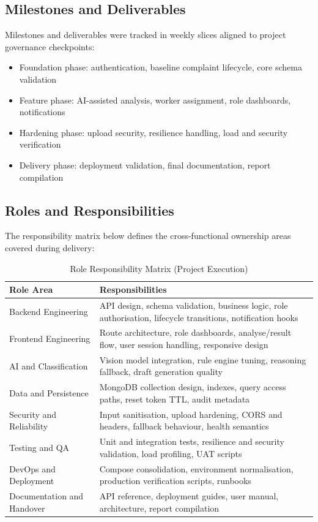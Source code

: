 \subsection{Milestones and Deliverables}

Milestones and deliverables were tracked in weekly slices aligned to project governance checkpoints:

\begin{itemize}
\item Foundation phase: authentication, baseline complaint lifecycle, core schema validation
\item Feature phase: AI-assisted analysis, worker assignment, role dashboards, notifications
\item Hardening phase: upload security, resilience handling, load and security verification
\item Delivery phase: deployment validation, final documentation, report compilation
\end{itemize}

\subsection{Roles and Responsibilities}

The responsibility matrix below defines the cross-functional ownership areas covered during delivery:

\begin{table}[H]
\centering
\small
\begin{tabularx}{\textwidth}{|>{\RaggedRight\arraybackslash}p{}|>{\RaggedRight\arraybackslash}X|}
\hline
\textbf{Role Area} & \textbf{Responsibilities} \\ \hline
Backend Engineering & API design, schema validation, business logic, role authorisation, lifecycle transitions, notification hooks \\ \hline
Frontend Engineering & Route architecture, role dashboards, analyse/result flow, user session handling, responsive design \\ \hline
AI and Classification & Vision model integration, rule engine tuning, reasoning fallback, draft generation quality \\ \hline
Data and Persistence & MongoDB collection design, indexes, query access paths, reset token TTL, audit metadata \\ \hline
Security and Reliability & Input sanitisation, upload hardening, CORS and headers, fallback behaviour, health semantics \\ \hline
Testing and QA & Unit and integration tests, resilience and security validation, load profiling, UAT scripts \\ \hline
DevOps and Deployment & Compose consolidation, environment normalisation, production verification scripts, runbooks \\ \hline
Documentation and Handover & API reference, deployment guides, user manual, architecture, report compilation \\ \hline
\end{tabularx}
\captionsetup{position=bottom}
\caption{Role Responsibility Matrix (Project Execution)}
\end{table}

